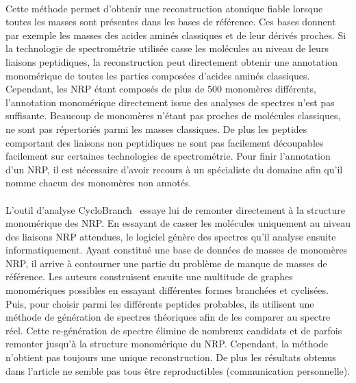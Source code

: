 \documentclass[12pt,french,twoside]{report}
\begin{document}
\paragraph{}Cette méthode permet d'obtenir une reconstruction atomique fiable lorsque toutes les masses sont présentes dans les bases de référence.
Ces bases donnent par exemple les masses des acides aminés classiques et de leur dérivés proches.
Si la technologie de spectrométrie utilisée casse les molécules au niveau de leurs liaisons peptidiques, la reconstruction peut directement obtenir une annotation monomérique de toutes les parties composées d'acides aminés classiques.
Cependant, les NRP étant composés de plus de 500 monomères différents, l'annotation monomérique directement issue des analyses de spectres n'est pas suffisante.
Beaucoup de monomères n'étant pas proches de molécules classiques, ne sont pas répertoriés parmi les masses classiques.
De plus les peptides comportant des liaisons non peptidiques ne sont pas facilement découpables facilement sur certaines technologies de spectrométrie.
Pour finir l'annotation d'un NRP, il est nécessaire d'avoir recours à un spécialiste du domaine afin qu'il nomme chacun des monomères non annotés.

\paragraph{}L'outil d'analyse CycloBranch~\cite{novak_cyclobranch:_2015} essaye lui de remonter directement à la structure monomérique des NRP.
En essayant de casser les molécules uniquement au niveau des liaisons NRP attendues, le logiciel génère des spectres qu'il analyse ensuite informatiquement.
Ayant constitué une base de données de masses de monomères NRP, il arrive à contourner une partie du problème de manque de masses de référence.
Les auteurs construisent ensuite une multitude de graphes monomériques possibles en essayant différentes formes branchées et cyclisées.
Puis, pour choisir parmi les différents peptides probables, ils utilisent une méthode de génération de spectres théoriques afin de les comparer au spectre réel.
Cette re-génération de spectre élimine de nombreux candidats et de parfois remonter jusqu'à la structure monomérique du NRP.
Cependant, la méthode n'obtient pas toujours une unique reconstruction.
De plus les résultats obtenus dans l'article ne semble pas tous être reproductibles (communication personnelle).
\end{document}
